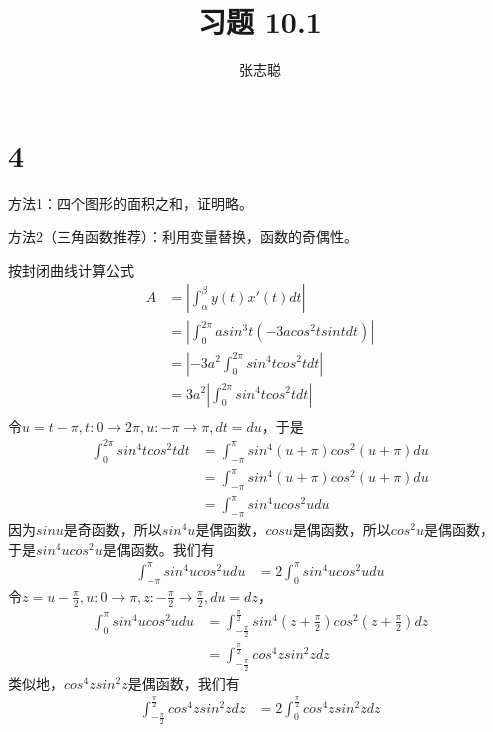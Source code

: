 \documentclass{article}
\begin{document}
\title{习题 10.1}
\author{张志聪}
\maketitle

\section*{4}

方法1：四个图形的面积之和，证明略。


方法2（三角函数推荐）：利用变量替换，函数的奇偶性。

按封闭曲线计算公式
\begin{align*}
  A & = \left|\int_{\alpha}^{\beta} y(t) x'(t) dt \right|              \\
    & = \left|\int_{0}^{2\pi} a sin^3 t (- 3a cos^2 t sint dt) \right| \\
    & = \left|- 3a^2\int_{0}^{2\pi} sin^4 t cos^2 t dt \right|         \\
    & = 3a^2 \left|\int_{0}^{2\pi} sin^4 t cos^2 t dt \right|          \\
\end{align*}
令$u = t - \pi, t: 0 \to 2\pi, u: -\pi \to \pi, dt = du$，于是
\begin{align*}
  \int_{0}^{2\pi} sin^4 t cos^2 t dt
   & = \int_{-\pi}^{\pi} sin^4 (u + \pi) cos^2(u + \pi) du \\
   & = \int_{-\pi}^{\pi} sin^4 (u + \pi) cos^2(u + \pi) du \\
   & = \int_{-\pi}^{\pi} sin^4 u cos^2u du
\end{align*}
因为$sinu$是奇函数，所以$sin^4u$是偶函数，$cosu$是偶函数，所以$cos^2u$是偶函数，
于是$sin^4 u cos^2u$是偶函数。我们有
\begin{align*}
  \int_{-\pi}^{\pi} sin^4 u cos^2u du
   & = 2 \int_{0}^{\pi} sin^4 u cos^2u du
\end{align*}
令$z = u - \frac{\pi}{2}, u: 0 \to \pi, z: -\frac{\pi}{2} \to \frac{\pi}{2}, du = dz$，
\begin{align*}
  \int_{0}^{\pi} sin^4 u cos^2u du
   & = \int_{-\frac{\pi}{2}}^{\frac{\pi}{2}} sin^4 (z + \frac{\pi}{2}) cos^2(z + \frac{\pi}{2}) dz \\
   & = \int_{-\frac{\pi}{2}}^{\frac{\pi}{2}} cos^4 z sin^2z dz
\end{align*}
类似地，$cos^4 z sin^2z$是偶函数，我们有
\begin{align*}
  \int_{-\frac{\pi}{2}}^{\frac{\pi}{2}} cos^4 z sin^2z dz
   & = 2 \int_{0}^{\frac{\pi}{2}} cos^4 z sin^2z dz
\end{align*}
\end{document}
